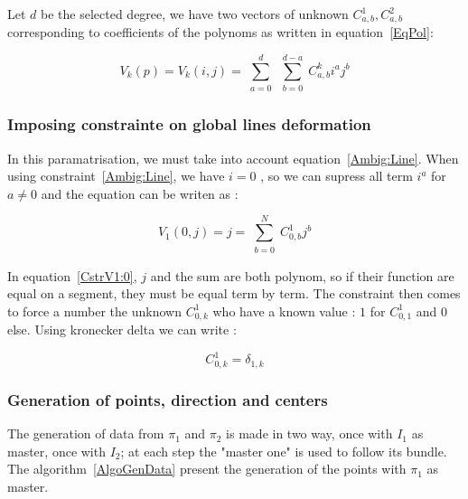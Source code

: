\documentclass{ipol}
\begin{document}
Let $d$ be the selected degree, we have two vectors of unknown $C^1_{a,b},C^2_{a,b}$ 
corresponding to coefficients of the polynoms as written in equation~\ref{EqPol}:


\begin{equation}
   V_k(p) = V_k(i,j) =  \sum\limits_{\substack{a=0}}^d  \sum\limits_{\substack{b=0}}^{d-a}  C^k_{a,b}  i^a j^b \label{EqPol}
\end{equation}
   
\subsubsection{Imposing constrainte on global lines deformation}

In this paramatrisation, we must take into account equation~\ref{Ambig:Line}.
When using constraint~\ref{Ambig:Line}, we have  $i=0$ , so we can supress all term  $i^a$ for $a\neq 0$
and the equation can be writen as :


\begin{equation}
    V_1(0,j) =  j =   \sum\limits_{\substack{b=0}}^{N}  C^1_{0,b}  j^b  \label{CstrV1:0}
\end{equation}

In equation~\ref{CstrV1:0}, $j$ and the  sum are both polynom, so if their function are equal on a segment, they
must be equal term by term. The constraint then comes to force a number the
unknown $C^1_{0,k}$ who have a known value  : $1$ for $C^1_{0,1}$ and $0$ else.
Using kronecker delta we can write :

\begin{equation}
         C^1_{0,k} = \delta_{1,k} \label{CstrV1:1}
\end{equation}

\subsubsection{Generation of points, direction and centers}

The generation of  data from $\pi_1$ and $\pi_2$  is made
in two way, once with $I_1$ as master, once with $I_2$;
at each step the  "master one" is 
used to follow its bundle. The algorithm~\ref{AlgoGenData} present the 
generation of the points with $\pi_1$  as master.
\end{document}
